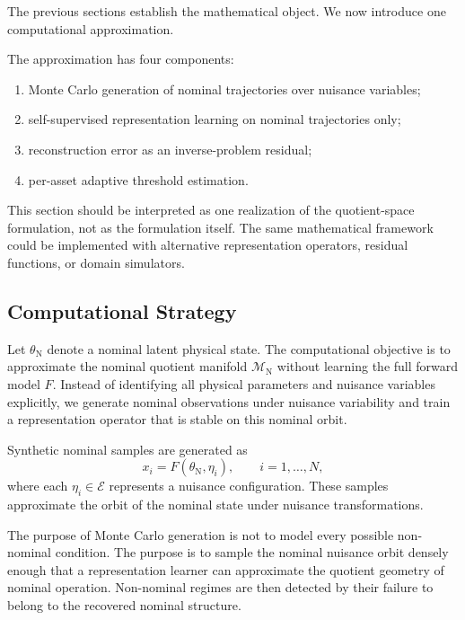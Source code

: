 \documentclass[11pt,letterpaper]{article}
\newcommand{\EtaSpace}{\ensuremath{\mathcal{E}}}
\newcommand{\Mnominal}{\ensuremath{\mathcal{M}_{\mathrm{N}}}}
\begin{document}
The previous sections establish the mathematical object.
We now introduce one computational approximation.

The approximation has four components:

\begin{enumerate}[label=(\arabic*)]
    \item Monte Carlo generation of nominal trajectories over nuisance variables;
    \item self-supervised representation learning on nominal trajectories only;
    \item reconstruction error as an inverse-problem residual;
    \item per-asset adaptive threshold estimation.
\end{enumerate}

This section should be interpreted as one realization of the quotient-space formulation, not as the formulation itself.
The same mathematical framework could be implemented with alternative representation operators, residual functions, or domain simulators.

\subsection{Computational Strategy}

Let \(\theta_{\mathrm{N}}\) denote a nominal latent physical state.
The computational objective is to approximate the nominal quotient manifold \(\Mnominal\) without learning the full forward model \(F\).
Instead of identifying all physical parameters and nuisance variables explicitly, we generate nominal observations under nuisance variability and train a representation operator that is stable on this nominal orbit.

Synthetic nominal samples are generated as
\begin{equation}
x_i = F(\theta_{\mathrm{N}},\eta_i),
\qquad i=1,\ldots,N,
\label{eq:nominal_mc_samples}
\end{equation}
where each \(\eta_i \in \EtaSpace\) represents a nuisance configuration.
These samples approximate the orbit of the nominal state under nuisance transformations.

The purpose of Monte Carlo generation is not to model every possible non-nominal condition.
The purpose is to sample the nominal nuisance orbit densely enough that a representation learner can approximate the quotient geometry of nominal operation.
Non-nominal regimes are then detected by their failure to belong to the recovered nominal structure.
\end{document}
